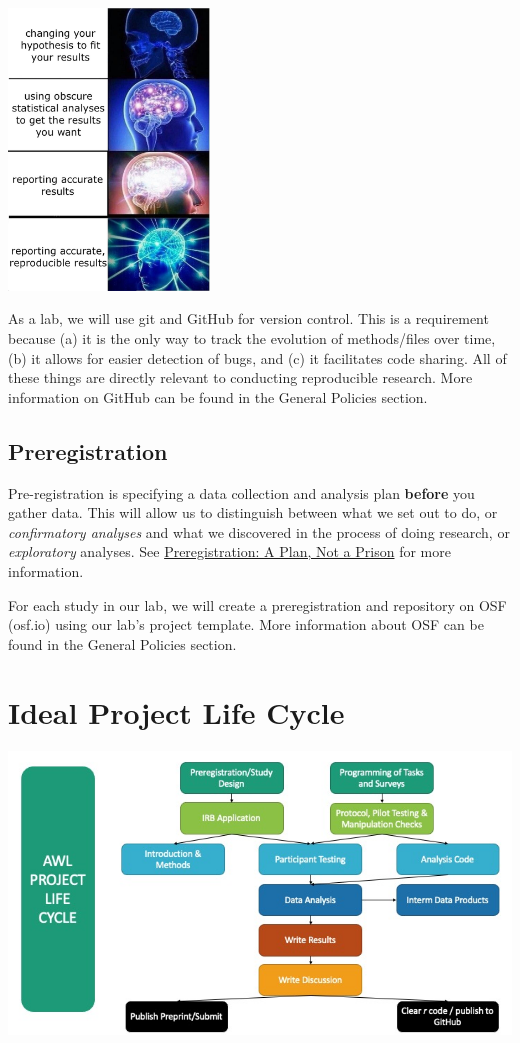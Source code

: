 \documentclass[]{book}
\begin{document}
\includegraphics[width=0.4\textwidth,height=\textheight]{images/expanding_brain.jpeg}

As a lab, we will use git and GitHub for version control. This is a requirement because (a) it is the only way to track the evolution of methods/files over time, (b) it allows for easier detection of bugs, and (c) it facilitates code sharing. All of these things are directly relevant to conducting reproducible research. More information on GitHub can be found in the General Policies section.

\hypertarget{preregistration}{%
\subsection{Preregistration}\label{preregistration}}

Pre-registration is specifying a data collection and analysis plan \textbf{before} you gather data. This will allow us to distinguish between what we set out to do, or \emph{confirmatory analyses} and what we discovered in the process of doing research, or \emph{exploratory} analyses. See \href{https://cos.io/blog/preregistration-plan-not-prison/}{Preregistration: A Plan, Not a Prison} for more information.

For each study in our lab, we will create a preregistration and repository on OSF (osf.io) using our lab's project template. More information about OSF can be found in the General Policies section.

\hypertarget{ideal-project-life-cycle}{%
\section{Ideal Project Life Cycle}\label{ideal-project-life-cycle}}

\includegraphics{images/PLC.jpg}
\end{document}
